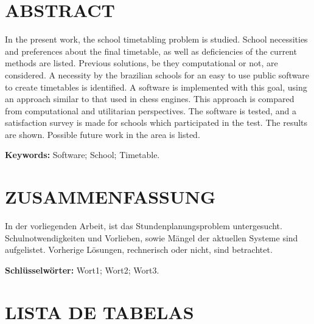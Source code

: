 \documentclass[12pt,a4paper]{article}
\begin{document}
	\thispagestyle{empty}
	\section*{ABSTRACT}

	In the present work, the school timetabling problem is studied. School necessities and preferences about the final timetable, as well as deficiencies of the current methods are listed. Previous solutions, be they computational or not, are considered. A necessity by the brazilian schools for an easy to use public software to create timetables is identified. A software is implemented with this goal, using an approach similar to that used in chess engines. This approach is compared from computational and utilitarian perspectives. The software is tested, and a satisfaction survey is made for schools which participated in the test. The results are shown. Possible future work in the area is listed.

	\begingroup
		\setlength{\parindent}{0mm}
		\textbf{Keywords:} Software; School; Timetable.
	\endgroup

	\newpage


	\thispagestyle{empty}
	\section*{ZUSAMMENFASSUNG}

	In der vorliegenden Arbeit, ist das Stundenplanungsproblem untergesucht. Schulnotwendigkeiten und Vorlieben, sowie Mängel der aktuellen Systeme sind aufgelistet. Vorherige Lösungen, rechnerisch oder nicht, sind betrachtet.

	\lipsum[1]


	\begingroup
		\setlength{\parindent}{0mm}
		\textbf{Schlüsselwörter:} Wort1; Wort2; Wort3.
	\endgroup

	\newpage

	\thispagestyle{empty}
	\section*{LISTA DE TABELAS}
\end{document}
